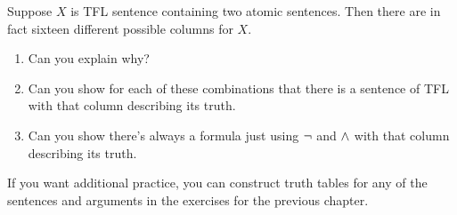 \begin{practiceproblems}
\begin{enumerate}
\end{enumerate}
\problempart
Suppose $X$ is TFL sentence containing two atomic sentences. Then there are in fact sixteen different possible columns for $X$.
\begin{enumerate}
\item Can you explain why?
\item Can you show for each of these combinations that there is a sentence of TFL with that column describing its truth.
\item {} Can you show there's always a formula just using $\neg$ and $\mathbin{\wedge}$ with that column describing its truth.
\end{enumerate}

If you want additional practice, you can construct truth tables for any of the sentences and arguments in the exercises for the previous chapter.


\end{practiceproblems}
